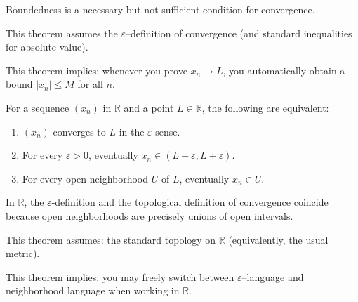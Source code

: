 \begin{remark}
Boundedness is a necessary but not sufficient condition for convergence.
\end{remark}

\begin{remark}
    This theorem assumes the $\varepsilon$--definition of convergence (and standard inequalities for absolute value).

    This theorem implies: whenever you prove $x_n \to L$, you automatically obtain a bound $|x_n|\le M$ for all $n$.
\end{remark}

\begin{theorem}
For a sequence $(x_n)$ in $\mathbb{R}$ and a point $L\in\mathbb{R}$, the following
are equivalent:
\begin{enumerate}
\item $(x_n)$ converges to $L$ in the $\varepsilon$-sense.
\item For every $\varepsilon>0$, eventually $x_n\in (L-\varepsilon,L+\varepsilon)$.
\item For every open neighborhood $U$ of $L$, eventually $x_n\in U$.
\end{enumerate}
\end{theorem}

\begin{remark}
In $\mathbb{R}$, the $\varepsilon$-definition and the topological definition of
convergence coincide because open neighborhoods are precisely unions of open
intervals.
\end{remark}

\begin{remark}
    This theorem assumes: the standard topology on $\mathbb{R}$ (equivalently, the usual metric).
    
    This theorem implies: you may freely switch between $\varepsilon$--language and neighborhood language when working in $\mathbb{R}$.
\end{remark}









